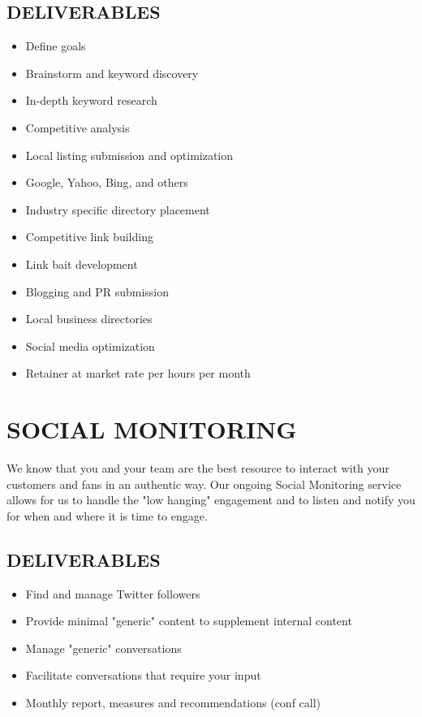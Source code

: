 \documentclass[12pt]{report}
\begin{document}
\subsection{DELIVERABLES}
\begin{itemize}
\item Define goals
\item Brainstorm and keyword discovery
\item In-depth keyword research
\item Competitive analysis
\item Local listing submission and optimization
\item Google, Yahoo, Bing, and others
\item Industry specific directory placement
\item Competitive link building
\item Link bait development
\item Blogging and PR submission
\item Local business directories
\item Social media optimization
\item Retainer at market rate per hours per month
\end{itemize}

\section{SOCIAL MONITORING}
\item We know that you and your team are the best resource to interact with your customers and fans in an authentic way. Our ongoing Social Monitoring service allows for us to handle the "low hanging" engagement and to listen and notify you for when and where it is time to engage.
\subsection{DELIVERABLES}
\begin{itemize}
\item Find and manage Twitter followers
\item Provide minimal "generic" content to supplement internal content
\item Manage "generic" conversations
\item Facilitate conversations that require your input
\item Monthly report, measures and recommendations (conf call)
\end{itemize}
\end{document}
